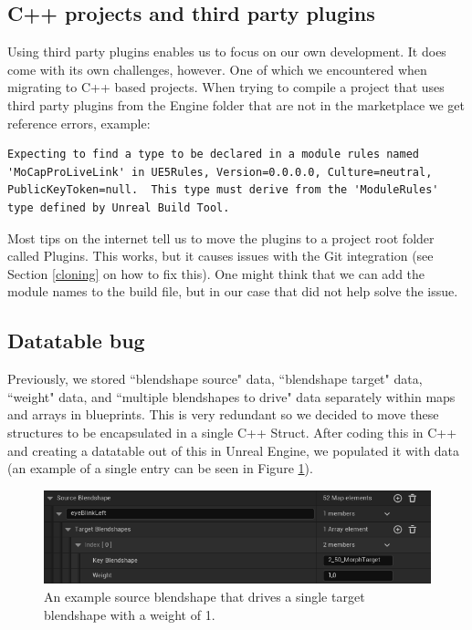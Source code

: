 \documentclass{uva-inf-article}
\begin{document}
\subsection{C++ projects and third party plugins}\label{cppThirdPartyPluginsBug}
Using third party plugins enables us to focus on our own development. It does come with its own challenges, however. One of which we encountered when migrating to C++ based projects. When trying to compile a project that uses third party plugins from the Engine folder that are not in the marketplace we get reference errors, example:
\begin{lstlisting}
Expecting to find a type to be declared in a module rules named 'MoCapProLiveLink' in UE5Rules, Version=0.0.0.0, Culture=neutral, PublicKeyToken=null.  This type must derive from the 'ModuleRules' type defined by Unreal Build Tool.
\end{lstlisting}
Most tips on the internet tell us to move the plugins to a project root folder called Plugins. This works, but it causes issues with the Git integration (see Section \ref{cloning} on how to fix this). One might think that we can add the module names to the build file, but in our case that did not help solve the issue.

\subsection{Datatable bug}\label{datatableBug}
Previously, we stored ``blendshape source" data, ``blendshape target" data, ``weight" data, and ``multiple blendshapes to drive" data separately within maps and arrays in blueprints. This is very redundant so we decided to move these structures to be encapsulated in a single C++ Struct. After coding this in C++ and creating a datatable out of this in Unreal Engine, we populated it with data (an example of a single entry can be seen in Figure \ref{fig:blendshapeStructExample}).

\begin{figure}[hbt!]
    \centering
    \includegraphics[width=\textwidth]{imgs/singleBlendshapeData.png}
    \caption{An example source blendshape that drives a single target blendshape with a weight of 1.}
    \label{fig:blendshapeStructExample}
\end{figure}
\end{document}
